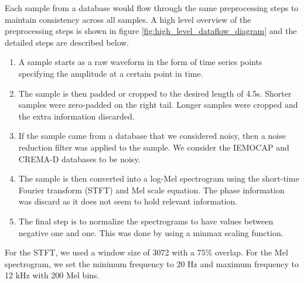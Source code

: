 \documentclass[conference]{IEEEtran}
\begin{document}
Each sample from a database would flow through the same preprocessing steps to maintain consistency across all samples. A high level overview of the preprocessing steps is shown in figure \ref{fig:high_level_dataflow_diagram} and the detailed steps are described below.
\begin{enumerate}
	\item A sample starts as a raw waveform in the form of time series points specifying the amplitude at a certain point in time.
	\item The sample is then padded or cropped to the desired length of 4.5s. Shorter samples were zero-padded on the right tail. Longer samples were cropped and the extra information discarded.
	\item If the sample came from a database that we considered noisy, then a noise reduction filter was applied to the sample. We consider the IEMOCAP and CREMA-D databases to be noisy.
	\item The sample is then converted into a log-Mel spectrogram using the short-time Fourier transform (STFT) and Mel scale equation. The phase information was discard as it does not seem to hold relevant information. \cite{Kozakowski2017}
	\item The final step is to normalize the spectrograms to have values between negative one and one. This was done by using a minmax scaling function.
\end{enumerate}

For the STFT, we used a window size of 3072 with a 75\% overlap. For the Mel spectrogram, we set the minimum frequency to 20 Hz and maximum frequency to 12 kHz with 200 Mel bins.
\end{document}
